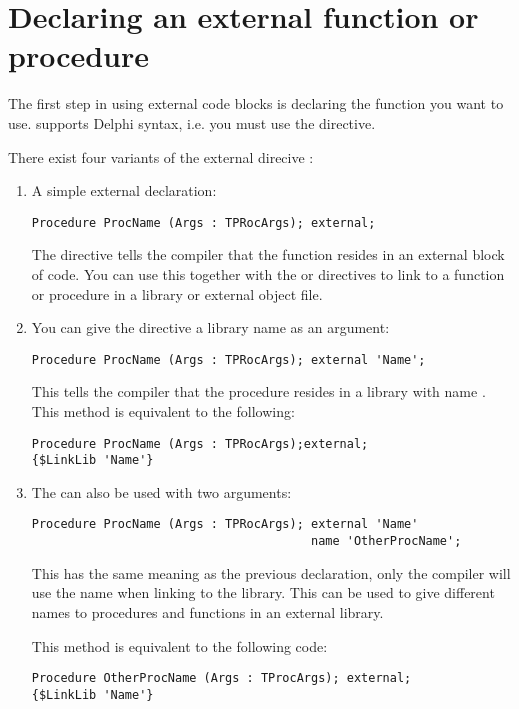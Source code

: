 \documentclass{report}
\begin{document}
\section{Declaring an external function or procedure}
\label{se:ExternalDeclaration}

The first step in using external code blocks is declaring the function you
want to use. \fpc supports Delphi syntax, i.e. you must use the
 directive.

There exist four variants of the external direcive :
\begin{enumerate}
\item A simple external declaration:
\begin{verbatim}
Procedure ProcName (Args : TPRocArgs); external;
\end{verbatim}
The  directive tells the compiler that the function resides in
an external block of code. You can use this together with the 
or  directives to link to a function or procedure in a
library or external object file.

\item You can give the  directive a library name as an
argument:
\begin{verbatim}
Procedure ProcName (Args : TPRocArgs); external 'Name';
\end{verbatim}
This tells the compiler that the procedure resides in a library with name
. This method is equivalent to the following:
\begin{verbatim}
Procedure ProcName (Args : TPRocArgs);external;
{$LinkLib 'Name'}
\end{verbatim}
\item The  can also be used with two arguments:
\begin{verbatim}
Procedure ProcName (Args : TPRocArgs); external 'Name'
                                       name 'OtherProcName';
\end{verbatim}
This has the same meaning as the previous declaration, only the compiler
will use the name  when linking to the library. This
can be used to give different names to procedures and functions in an
external library.

This method is equivalent to the following code:
\begin{verbatim}
Procedure OtherProcName (Args : TProcArgs); external;
{$LinkLib 'Name'}


\end{verbatim}
\end{enumerate}
\end{document}
